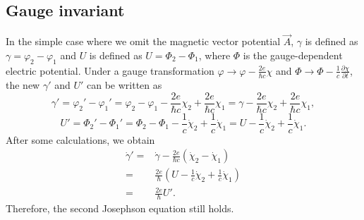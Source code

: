 \subsection{Gauge invariant}

In the simple case where we omit the magnetic vector potential $\overrightarrow{A}$,
$\gamma$ is defined as $\gamma=\varphi_{2}-\varphi_{1}$ and $U$
is defined as $U=\Phi_{2}-\Phi_{1}$, where $\Phi$ is the gauge-dependent
electric potential. Under a gauge transformation $\varphi\to\varphi-\frac{2e}{\hbar c}\chi$
and $\Phi\to\Phi-\frac{1}{c}\frac{\partial\chi}{\partial t}$, the
new $\gamma'$ and $U'$ can be written as
\begin{equation}
\gamma'=\varphi_{2}'-\varphi_{1}'=\varphi_{2}-\varphi_{1}-\frac{2e}{\hbar c}\chi_{2}+\frac{2e}{\hbar c}\chi_{1}=\gamma-\frac{2e}{\hbar c}\chi_{2}+\frac{2e}{\hbar c}\chi_{1},
\end{equation}
\begin{equation}
U'=\Phi_{2}'-\Phi_{1}'=\Phi_{2}-\Phi_{1}-\frac{1}{c}\dot{\chi}_{2}+\frac{1}{c}\dot{\chi}_{1}=U-\frac{1}{c}\dot{\chi}_{2}+\frac{1}{c}\dot{\chi}_{1}.
\end{equation}
After some calculations, we obtain
\begin{equation}
\begin{split}\dot{\gamma}'= & \dot{\gamma}-\frac{2e}{\hbar c}(\dot{\chi}_{2}-\dot{\chi}_{1})\\
= & \frac{2e}{\hbar}(U-\frac{1}{c}\dot{\chi}_{2}+\frac{1}{c}\dot{\chi}_{1})\\
= & \frac{2e}{\hbar}U'.
\end{split}
\end{equation}
Therefore, the second Josephson equation still holds. 

